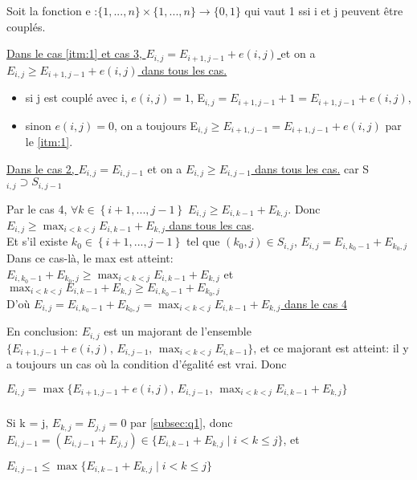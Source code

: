 \documentclass[french]{article}
\begin{document}
		Soit la fonction e :$ \{1, ... , n\} \times{} \{1, ... , n\} \rightarrow{} \{0, 1\}$ qui vaut 1 ssi i et j peuvent être couplés. \par
		\begin{description}
		\item
		\underline{Dans le cas  \ref{itm:1} et cas 3, $E_{i,j} = E_{i+1,j-1} + e(i,j)$ }  
et on a  \underline{$E_{i,j} \geq E_{i+1,j-1} + e(i,j)$ dans tous les cas. } 
			\begin{itemize} 
			\item si j est couplé avec i, $ e(i,j) = 1$, E$_{i,j}  = E_{i+1,j-1}+1 = E_{i+1,j-1}+ e(i,j) $, 
			\item sinon $ e(i,j) = 0$, on a toujours E$_{i,j} \geq E_{i+1,j-1} = E_{i+1,j-1}+ e(i,j)$ par le \ref{itm:1}.
			\end{itemize}	
		\item
		\underline{Dans le cas 2, $E_{i,j} = E_{i,j-1}$} et on a \underline{$E_{i,j} \geq E_{i,j-1}$ dans tous les cas.} car S$_{i,j} \supset S_{i,j-1}$
		\item
		Par le cas 4, $\forall k \in\left\{ i+1,...,j-1\right\} \; E_{i,j} \geq E_{i,k-1} + E_{k,j}$. Donc \underline{ $E_{i,j} \geq  \displaystyle \max_{i<k<j}  E_{i,k-1} + E_{k,j}$ dans tous les cas}.
		\\Et
		s'il existe $k_{0}\in\left\{ i+1,...,j-1\right\}$ tel que  $\left(k_{0},j\right)\in S_{i,j}$, $E_{i,j} = E_{i,k_{0}-1} + E_{k_{0},j}$\\
		Dans ce cas-là, le max est atteint:\\
		 $E_{i,k_{0}-1} + E_{k_{0},j} \geq  \displaystyle \max_{i<k<j}  E_{i,k-1} + E_{k,j}$ et $ \displaystyle \max_{i<k<j}  E_{i,k-1} + E_{k,j} \geq  E_{i,k_{0}-1} + E_{k_{0},j}$\\
		D'où \underline{ $E_{i,j} = E_{i,k_{0}-1} + E_{k_{0},j} = \displaystyle \max_{i<k<j}  E_{i,k-1} + E_{k,j}$ dans le cas 4}
		\end{description}
		En conclusion: $E_{i,j}$ est un majorant de l'ensemble $\{E_{i+1,j-1} + e(i,j), \, E_{i,j-1}, \,  \displaystyle \max_{i<k<j}  E_{i,k-1} \}$, et ce majorant est atteint: il y a toujours un cas où la condition d'égalité est vrai. 
		Donc
\begin{center}
 $E_{i,j} =\max\{E_{i+1,j-1} + e(i,j), \, E_{i,j-1}, \,  \displaystyle \max_{i<k<j}  E_{i,k-1} + E_{k,j}\}$
\par\end{center}
		
	\subsubsection{}
	Si k = j, $ E_{k,j}=E_{j,j}=0$ par \ref{subsec:q1}, donc $E_{i,j-1}=(E_{i,j-1}+E_{j,j})\in \{E_{i,k-1} + E_{k,j} \mid i<k\leq j   \} $, et 
\begin{center}
$E_{i,j-1}\leq \max \{E_{i,k-1} + E_{k,j} \mid i<k\leq j   \} $
\par\end{center}
\end{document}
